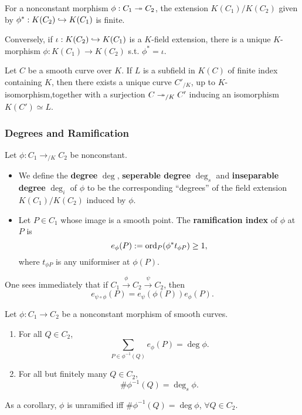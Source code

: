 \begin{theorem}
For a nonconstant morphism $\phi : C_1\twoheadrightarrow C_2$, the extension $K(C_1)/K(C_2)$ given by $\phi^* : K(C_2)\hookrightarrow K(C_1)$ is finite.

Conversely, if $\iota : K(C_2)\hookrightarrow K(C_1)$ is a $K$-field extension, there is a unique $K$-morphism $\phi : K(C_1)\to K(C_2)$ s.t. $\phi^* = \iota$.
\end{theorem}


\begin{theorem}
    Let $C$ be a smooth curve over $K$. If $L$ is a subfield in $K(C)$ of finite index containing $K$, then there exists a unique curve $C'_{/K}$, up to $K$-isomorphism,together with a surjection $C\twoheadrightarrow_{/K} C'$ inducing an isomorphism $K(C')\simeq L$.
\end{theorem}

\subsubsection*{Degrees and Ramification}
\begin{definition}
Let $\phi : C_1\to_{/K} C_2$ be nonconstant.
\begin{itemize}
    \item  We define the \textbf{degree} $\deg$, \textbf{seperable degree} $\deg_s$ and \textbf{inseparable degree} $\deg_i$ of $\phi$ to be the corresponding ``degrees'' of the field extension $K(C_1)/K(C_2)$ induced by $\phi$.
    \item Let $P\in C_1$ whose image is a smooth point. The \textbf{ramification index} of $\phi$ at $P$ is \[e_\phi(P) := \operatorname{ord}_P (\phi^*t_{\phi P})\ge 1,\]
    where $t_{\phi P}$ is any uniformiser at $\phi(P)$.
\end{itemize}
\end{definition}
One sees immediately that if $C_1\stackrel{\phi}{\to} C_2\stackrel{\psi}{\to}C_2$, then \[e_{\psi\circ\phi}(P) = e_{\psi}(\phi(P))e_{\phi}(P).\]
\begin{proposition}
    Let $\phi : C_1\to C_2$ be a nonconstant morphism of smooth curves.\begin{enumerate}
        \item For all $Q\in C_2$,\[\sum_{P\in\phi^{-1}(Q)} e_\phi(P) = \deg\phi.\]
        \item For all but finitely many $Q\in C_2$,\[\#\phi^{-1}(Q) = \deg_s\phi.\]
    \end{enumerate}
\end{proposition}
As a corollary, $\phi$ is unramified iff $\#\phi^{-1}(Q) = \deg\phi$, $\forall Q\in C_2$.


